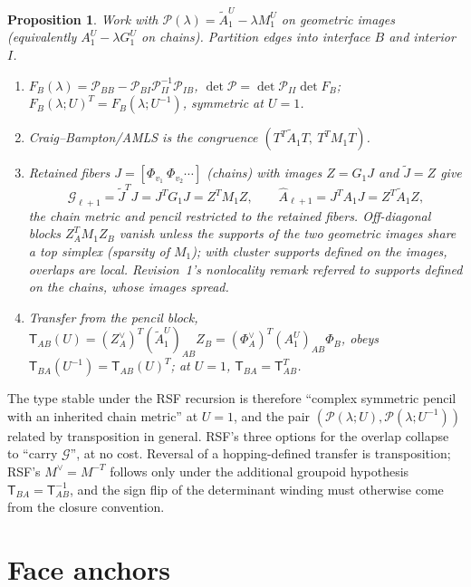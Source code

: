 \documentclass[11pt]{article}
\theoremstyle{definition}
\theoremstyle{plain}
\newtheorem{proposition}{Proposition}[section]
\theoremstyle{remark}
\newcommand{\Tr}{^{T}}
\newcommand{\At}{\widetilde{A}}
\newcommand{\Tp}{\mathsf{T}}
\begin{document}
\begin{proposition}\label{prop:pencil}
Work with \(\mathcal P(\lambda)=\At_1^{U}-\lambda M_1^{U}\) on geometric images (equivalently \(A_1^{U}-\lambda G_1^{U}\) on chains). Partition edges into interface \(B\) and interior \(I\).
\begin{enumerate}[nosep]
\item[(a)] \(F_B(\lambda)=\mathcal P_{BB}-\mathcal P_{BI}\mathcal P_{II}^{-1}\mathcal P_{IB}\), \(\det\mathcal P=\det\mathcal P_{II}\det F_B\); \(F_B(\lambda;U)\Tr=F_B(\lambda;U^{-1})\), symmetric at \(U=1\).
\item[(b)] Craig--Bampton/AMLS is the congruence \((T\Tr\At_1T,\ T\Tr M_1T)\).
\item[(c)] Retained fibers \(J=[\Phi_{v_1}\ \Phi_{v_2}\cdots]\) (chains) with images \(Z=G_1J\) and \(\widetilde J=Z\) give
\[
\mathcal G_{\ell+1}=\widetilde J\Tr J=J\Tr G_1J=Z\Tr M_1Z,\qquad \hat A_{\ell+1}=J\Tr A_1J=Z\Tr\At_1Z ,
\]
the chain metric and pencil restricted to the retained fibers. Off-diagonal blocks \(Z_A\Tr M_1Z_B\) vanish unless the supports of the two geometric images share a top simplex (sparsity of \(M_1\)); with cluster supports defined on the images, overlaps are local. Revision~1's nonlocality remark referred to supports defined on the chains, whose images spread.
\item[(d)] Transfer from the pencil block, \(\Tp_{AB}(U)=(Z_A^{\vee})\Tr(\At_1^{U})_{AB}Z_B=(\Phi_A^{\vee})\Tr(A_1^{U})_{AB}\Phi_B\), obeys \(\Tp_{BA}(U^{-1})=\Tp_{AB}(U)\Tr\); at \(U=1\), \(\Tp_{BA}=\Tp_{AB}\Tr\).
\end{enumerate}
\end{proposition}
The type stable under the RSF recursion is therefore ``complex symmetric pencil with an inherited chain metric'' at \(U=1\), and the pair \((\mathcal P(\lambda;U),\mathcal P(\lambda;U^{-1}))\) related by transposition in general. RSF's three options for the overlap collapse to ``carry \(\mathcal G\)'', at no cost. Reversal of a hopping-defined transfer is transposition; RSF's \(M^{\vee}=M^{-T}\) follows only under the additional groupoid hypothesis \(\Tp_{BA}=\Tp_{AB}^{-1}\), and the sign flip of the determinant winding must otherwise come from the closure convention.

\section{Face anchors}\label{sec:anchor}
\end{document}

